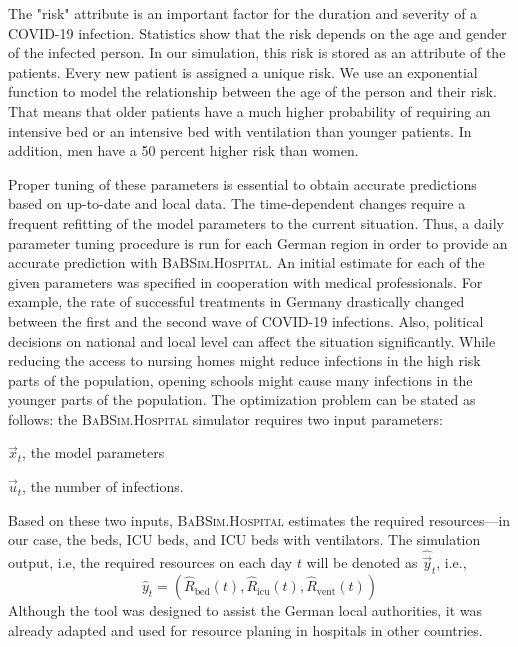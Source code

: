 \documentclass[conference]{IEEEtran}
\newcommand{\babsimhospital}{\textsc{BaBSim.Hospital}\xspace}
\begin{document}
The "risk" attribute is an important factor for the duration and severity of a COVID-19 infection. 
Statistics show that the risk depends on the age and gender of the infected person. 
In our simulation, this risk is stored as an attribute of the patients. 
Every new patient is assigned a unique risk. 
We use an exponential function to model the relationship between the age of the person and their risk.
That means that older patients have a much higher probability of requiring an intensive bed or an intensive bed with ventilation than younger patients. 
In addition, men have a 50 percent higher risk than women. 

Proper tuning of these parameters is essential to obtain accurate predictions based on up-to-date and local data. 
The time-dependent changes require a frequent refitting of the model parameters to the current situation.
Thus, a daily parameter tuning procedure is run for each German region in order to provide an accurate prediction with \babsimhospital. 
An initial estimate for each of the given parameters was specified in cooperation with medical professionals. 
For example, the rate of successful treatments in Germany drastically changed between the first and the second wave of COVID-19 infections. 
Also, political decisions on national and local level can affect the situation significantly. 
While reducing the access to nursing homes might reduce infections in the high risk parts of the population, opening schools might cause many infections in the younger parts of the population. The optimization problem can be stated as follows:
the \babsimhospital simulator requires two input parameters:
\begin{compactenum}
\item $\vec{x}_t$, the model parameters
\item $\vec{u}_t$, the number of infections.
\end{compactenum}
Based on these two inputs, \babsimhospital estimates the required resources---in our case, the beds, \gls{ICU} beds,  and \gls{ICU} beds with ventilators.
The simulation output, i.e, the required resources on each day $t$ will be denoted as $\hat{\vec{y}}_t$, i.e., 
\begin{equation}\label{eq:haty}
\hat{y}_t = \left( \hat{R}_{\text{bed}}(t),   \hat{R}_{\text{icu}}(t), \hat{R}_{\text{vent}}(t) \right)
\end{equation}
Although the tool was designed to assist the German local authorities, it was already adapted and used for resource planing in hospitals in other countries.
\end{document}
